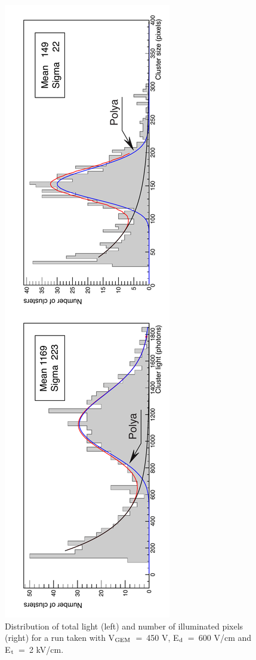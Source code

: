 \documentclass[a4paper]{jpconf}
\begin{document}
\begin{figure}[htbp]
\centering
\includegraphics[width=.27\textwidth, angle=270]{hq_s_Xray_run823.pdf}
\caption{Distribution of total light (left) and number of illuminated pixels (right) for a run taken with V$_{\rm GEM}$~=~450 V, E$_{\rm d}$~=~600 V/cm and E$_{\rm t}$~=~2 kV/cm.}
\label{fig:spectra}
\end{figure}
\end{document}
